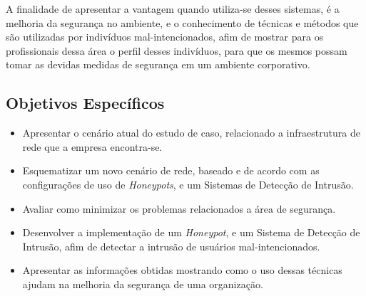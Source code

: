 A finalidade de apresentar a vantagem quando utiliza-se desses sistemas, é a melhoria da segurança no ambiente, e o conhecimento de técnicas e métodos que são utilizadas por indivíduos mal-intencionados, afim de mostrar para os profissionais dessa área o perfil desses indivíduos, para que os mesmos possam tomar as devidas medidas de segurança em um ambiente corporativo.

\subsection{Objetivos Específicos}
\begin{itemize}
  \item Apresentar o cenário atual do estudo de caso, relacionado a infraestrutura de rede que a empresa encontra-se.
\end{itemize}

\begin{itemize}
  \item Esquematizar um novo cenário de rede, baseado e de acordo com as configurações de uso de \textit{Honeypots}, e um Sistemas de Detecção de Intrusão.
\end{itemize}

\begin{itemize}
  \item Avaliar como minimizar os problemas relacionados a área de segurança.
\end{itemize}

\begin{itemize}
  \item Desenvolver a implementação de um \textit{Honeypot}, e um Sistema de Detecção de Intrusão, afim de detectar a intrusão de usuários mal-intencionados.
\end{itemize}

\begin{itemize}
  \item Apresentar as informações obtidas mostrando como o uso dessas técnicas ajudam na melhoria da segurança de uma organização.
\end{itemize}
